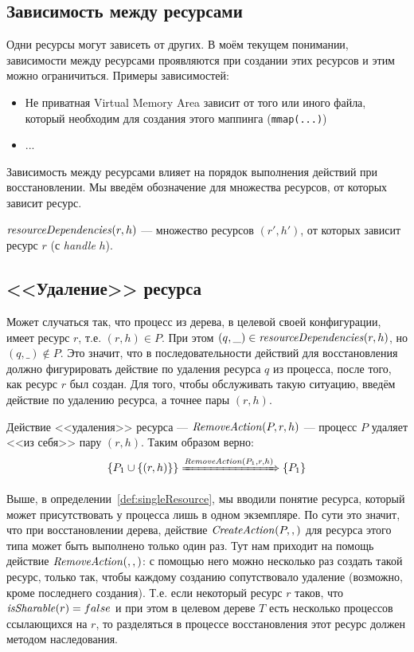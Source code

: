 \subsection{Зависимость между ресурсами}

Одни ресурсы могут зависеть от других. В моём текущем понимании, зависимости между ресурсами проявляются при создании этих ресурсов и этим можно ограничиться. Примеры зависимостей:

\begin{itemize}
	\item Не приватная Virtual Memory Area зависит от того или иного файла, который необходим для создания этого маппинга (\texttt{mmap(...)})
	\item ...
\end{itemize}

Зависимость между ресурсами влияет на порядок выполнения действий при восстановлении. Мы введём обозначение для множества ресурсов, от которых зависит ресурс.

\begin{defn}
\label{def:dependsprop}
$\text{\textit{resourceDependencies}}(r, h)$ --- множество ресурсов $(r', h')$, от которых зависит ресурс $r$ (с \textit{handle} $h$).
\end{defn}

\subsection{<<Удаление>> ресурса}

Может случаться так, что процесс из дерева, в целевой своей конфигурации, имеет ресурс $r$, т.е. $(r, h) \in P$. При этом $(q, \_) \in \text{\textit{resourceDependencies}}(r, h)$, но $(q, \_) \notin P$. Это значит, что в последовательности действий для восстановления должно фигурировать действие по удаления ресурса $q$ из процесса, после того, как ресурс $r$ был создан. Для того, чтобы обслуживать такую ситуацию, введём действие по удалению ресурса, а точнее пары $(r, h)$.

\begin{defn}
\label{def:removeact}
Действие <<удаления>> ресурса --- $\text{\textit{RemoveAction}}(P, r, h)$ --- процесс $P$ удаляет <<из себя>> пару $(r, h)$. Таким образом верно:
\begin{equation*}
	\left\lbrace P_1 \cup \left\lbrace (r, h) \right\rbrace \right\rbrace \xRightarrow{\text{\textit{RemoveAction}}(P_1, r, h)} \left\lbrace P_1 \right\rbrace
\end{equation*}
\end{defn}

Выше, в определении~\ref{def:singleResource}, мы вводили понятие ресурса, который может присутствовать у процесса лишь в одном экземпляре. По сути это значит, что при восстановлении дерева, действие $\text{\textit{CreateAction}}(P, , )$ для ресурса этого типа может быть выполнено только один раз. Тут нам приходит на помощь действие $\text{\textit{RemoveAction}}(, , )$: с помощью него можно несколько раз создать такой ресурс, только так, чтобы каждому созданию сопутствовало удаление (возможно, кроме последнего создания). Т.е. если некоторый ресурс $r$ таков, что $\text{\textit{isSharable}}(r) = false$ и при этом в целевом дереве $T$ есть несколько процессов ссылающихся на $r$, то разделяться в процессе восстановления этот ресурс должен методом наследования.

